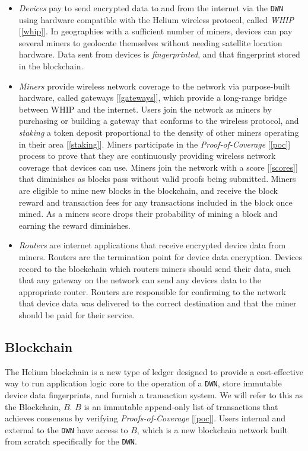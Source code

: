 \documentclass[letterpaper,11pt]{article}
\begin{document}
\begin{itemize}
    \item \emph{Devices} pay to send encrypted data to and from the internet via the \verb|DWN| using hardware compatible with the Helium wireless protocol, called \emph{WHIP} [\ref{whip}]. In geographies with a sufficient number of miners, devices can pay several miners to geolocate themselves without needing satellite location hardware. Data sent from devices is \emph{fingerprinted}, and that fingerprint stored in the blockchain.
    \item \emph{Miners} provide wireless network coverage to the network via purpose-built hardware, called gateways [\ref{gateways}], which provide a long-range bridge between WHIP and the internet. Users join the network as miners by purchasing or building a gateway that conforms to the wireless protocol, and \emph{staking} a token deposit proportional to the density of other miners operating in their area [\ref{staking}]. Miners participate in the \emph{Proof-of-Coverage} [\ref{poc}] process to prove that they are continuously providing wireless network coverage that devices can use. Miners join the network with a score [\ref{scores}] that diminishes as blocks pass without valid proofs being submitted. Miners are eligible to mine new blocks in the blockchain, and receive the block reward and transaction fees for any transactions included in the block once mined. As a miners score drops their probability of mining a block and earning the reward diminishes.
    \item \emph{Routers} are internet applications that receive encrypted device data from miners. Routers are the termination point for device data encryption. Devices record to the blockchain which routers miners should send their data, such that any gateway on the network can send any devices data to the appropriate router. Routers are responsible for confirming to the network that device data was delivered to the correct destination and that the miner should be paid for their service.
\end{itemize}

\subsection{Blockchain} \label{blockchain}

The Helium blockchain is a new type of ledger designed to provide a cost-effective way to run application logic core to the operation of a \verb|DWN|, store immutable device data fingerprints, and furnish a transaction system. We will refer to this as the Blockchain, $B$. $B$ is an immutable append-only list of transactions that achieves consensus by verifying \emph{Proofs-of-Coverage} [\ref{poc}]. Users internal and external to the \verb|DWN| have access to $B$, which is a new blockchain network built from scratch specifically for the \verb|DWN|.
\end{document}
